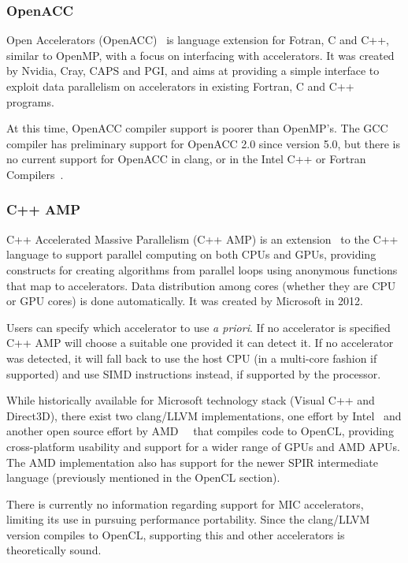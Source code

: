 \subsubsection{OpenACC}

Open Accelerators (OpenACC)~\cite{Group2013} is language extension for Fotran, C and C++, similar to OpenMP, with a focus on interfacing with accelerators. It was created by Nvidia, Cray, CAPS and PGI, and aims at providing a simple interface to exploit data parallelism on accelerators in existing Fortran, C and C++ programs.

At this time, OpenACC compiler support is poorer than OpenMP's. The GCC compiler has preliminary support for OpenACC 2.0 since version 5.0, but there is no current support for OpenACC in clang, or in the Intel C++ or Fortran Compilers~\cite{4_openacc.org_2015}.

\subsubsection{C++ AMP}

C++ Accelerated Massive Parallelism (C++ AMP) is an extension~\cite{Microsoft2013} to the C++ language to support parallel computing on both CPUs and GPUs, providing constructs for creating algorithms from parallel loops using anonymous functions that map to accelerators. Data distribution among cores (whether they are CPU or GPU cores) is done automatically. It was created by Microsoft in 2012.

Users can specify which accelerator to use \textit{a priori}. If no accelerator is specified C++ AMP will choose a suitable one provided it can detect it. If no accelerator was detected, it will fall back to use the host CPU (in a multi-core fashion if supported) and use SIMD instructions instead, if supported by the processor.

While historically available for Microsoft technology stack (Visual C++ and Direct3D), there exist two clang/LLVM implementations, one effort by Intel~\cite{Sharlet2012} and another open source effort by AMD~\cite{8_blogs.msdn.com_2015}~\cite{9_bitbucket.org_2015} that compiles code to OpenCL, providing cross-platform usability and support for a wider range of GPUs and AMD APUs. The AMD implementation also has support for the newer SPIR intermediate language (previously mentioned in the OpenCL section).

There is currently no information regarding support for MIC accelerators, limiting its use in pursuing performance portability. Since the clang/LLVM version compiles to OpenCL, supporting this and other accelerators is theoretically sound.

